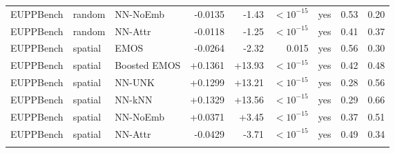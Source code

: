 \begin{table}[!htbp]
\begin{tabular}{lllrrrrcc}
EUPPBench & random & NN-NoEmb & -0.0135 & -1.43 & $<10^{-15}$ & yes & 0.53 & 0.20 \\
EUPPBench & random & NN-Attr & -0.0118 & -1.25 & $<10^{-15}$ & yes & 0.41 & 0.37 \\
\addlinespace
EUPPBench & spatial & EMOS & -0.0264 & -2.32 & 0.015 & yes & 0.56 & 0.30 \\
EUPPBench & spatial & Boosted EMOS & +0.1361 & +13.93 & $<10^{-15}$ & yes & 0.42 & 0.48 \\
EUPPBench & spatial & NN-UNK & +0.1299 & +13.21 & $<10^{-15}$ & yes & 0.28 & 0.56 \\
EUPPBench & spatial & NN-kNN & +0.1329 & +13.56 & $<10^{-15}$ & yes & 0.29 & 0.66 \\
EUPPBench & spatial & NN-NoEmb & +0.0371 & +3.45 & $<10^{-15}$ & yes & 0.37 & 0.51 \\
EUPPBench & spatial & NN-Attr & -0.0429 & -3.71 & $<10^{-15}$ & yes & 0.49 & 0.34 \\
\addlinespace
\bottomrule
\end{tabular}
\end{table}
